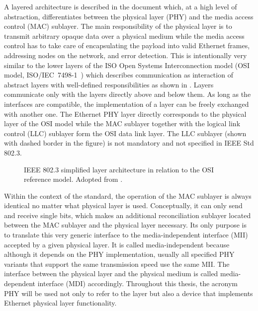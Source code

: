 \documentclass[a4paper, 11pt, oneside]{Thesis}  %
\begin{document}
A layered architecture is described in the document which, at a high level of abstraction, differentiates between the physical layer (PHY) and the media access control (MAC) sublayer. The main responsibility of the physical layer is to transmit arbitrary opaque data over a physical medium while the media access control has to take care of encapsulating the payload into valid Ethernet frames, addressing nodes on the network, and error detection. This is intentionally very similar to the lower layers of the ISO Open Systems Interconnection model (OSI model, ISO/IEC~7498-1~\cite{OSI}) which describes communication as interaction of abstract layers with well-defined responsibilities as shown in . Layers communicate only with the layers directly above and below them. As long as the interfaces are compatible, the implementation of a layer can be freely exchanged with another one. The Ethernet PHY layer directly corresponds to the physical layer of the OSI model while the MAC sublayer together with the logical link control (LLC) sublayer form the OSI data link layer. The LLC sublayer (shown with dashed border in the figure) is not mandatory and not specified in IEEE Std 802.3.

\begin{figure}
\centering

\caption[IEEE 802.3 simplified layer architecture in relation to the OSI reference model]{IEEE 802.3 simplified layer architecture in relation to the OSI reference model. Adopted from \cite[fig. 1-1]{Ethernet}.}
\label{fig:ieee8023layers}
\end{figure}

Within the context of the standard, the operation of the MAC sublayer is always identical no matter what physical layer is used. Conceptually, it can only send and receive single bits, which makes an additional reconciliation sublayer located between the MAC sublayer and the physical layer necessary. Its only purpose is to translate this very generic interface to the media-independent interface (MII) accepted by a given physical layer. It is called media-independent because although it depends on the PHY implementation, usually all specified PHY variants that support the same transmission speed use the same MII. The interface between the physical layer and the physical medium is called media-dependent interface (MDI) accordingly. Throughout this thesis, the acronym PHY will be used not only to refer to the layer but also a device that implements Ethernet physical layer functionality.
\end{document}
